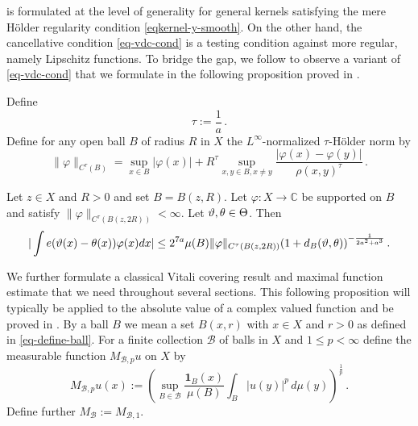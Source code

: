  is formulated at the level of generality
for general kernels satisfying the mere H\"older regularity condition \eqref{eqkernel-y-smooth}. On the other hand, the cancellative condition \eqref{eq-vdc-cond} is a testing condition against more regular,
namely Lipschitz functions. To bridge the gap, we follow \cite{zk-polynomial} to observe a variant of \eqref{eq-vdc-cond} that we formulate
in the following proposition proved in .


Define
\begin{equation}
    \tau:=\frac 1a\, .
\end{equation}
Define for any open ball $B$ of radius $R$ in $X$ the $L^\infty$-normalized $\tau$-H\"older norm by
\begin{equation}
    \label{eq-Holder-norm}
    \|\varphi\|_{C^\tau(B)} = \sup_{x \in B} |\varphi(x)| + R^\tau \sup_{x,y \in B, x \neq y} \frac{|\varphi(x) - \varphi(y)|}{\rho(x,y)^\tau}\,.
\end{equation}


\begin{proposition}
    \label{Holder-van-der-Corput}
    \leanok
     Let $z\in X$ and $R>0$ and set $B=B(z,R)$.
     Let $\varphi: X \to \mathbb{C}$ be
     supported on $B$ and satisfy $\|{\varphi}\|_{C^\tau(B(z, 2R))}<\infty$.
     Let ${\vartheta}, {\theta} \in {\Theta}$. Then
    \begin{equation}
        \label{eq-vdc-cond-tau-2}
        |\int e({\vartheta}(x)-{{\theta}(x)})\varphi(x) dx|\le
         2^{7a} \mu(B) \|{\varphi}\|_{C^\tau(B(z, 2R))}
       (1 + d_{B}({\vartheta},{\theta}))^{-\frac{1}{2a^2+a^3}}
    \,.
    \end{equation}
\end{proposition}

We further formulate a classical Vitali covering result
and maximal function estimate that we need throughout several sections.
This following proposition will typically be applied to the absolute value of a complex valued function and be proved in . By a ball $B$ we mean a set $B(x,r)$ with $x\in X$
and $r>0$ as defined in \eqref{eq-define-ball}.
For a finite collection $\mathcal{B}$ of balls in $X$
and $1\le p< \infty$ define the measurable function $M_{\mathcal{B},p}u$ on $X$ by
\begin{equation}\label{def-hlm}
    M_{\mathcal{B},p}u(x):=\left(\sup_{B\in \mathcal{B}} \frac{\mathbf{1}_{B}(x)}{\mu(B)}\int _{B} |u(y)|^p\, d\mu(y)\right)^\frac 1p\, .
\end{equation}
Define further $M_{\mathcal{B}}:=M_{\mathcal{B},1}$.

